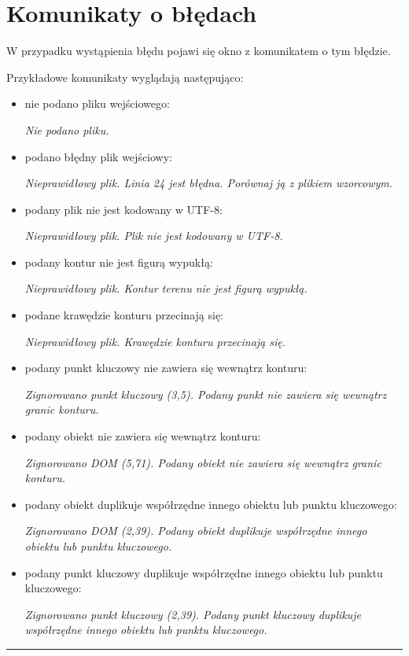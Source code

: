 \documentclass[a4paper,11pt]{article}
\newcommand{\linia}{\rule{\linewidth}{0.4mm}}
\begin{document}
\section{Komunikaty o błędach}
W przypadku wystąpienia błędu pojawi się okno z komunikatem o tym błędzie.

Przykładowe komunikaty wyglądają następująco:
\begin{itemize}
\item nie podano pliku wejściowego:

\textit{Nie podano pliku.}
\item podano błędny plik wejściowy:

\textit{Nieprawidłowy plik. Linia 24 jest błędna. Porównaj ją z plikiem wzorcowym.}
\item podany plik nie jest kodowany w UTF-8:

\textit{Nieprawidłowy plik. Plik nie jest kodowany w UTF-8.}
\item podany kontur nie jest figurą wypukłą:

\textit{Nieprawidłowy plik. Kontur terenu nie jest figurą wypukłą.}
\item podane krawędzie konturu przecinają się:

\textit{Nieprawidłowy plik. Krawędzie konturu przecinają się.}
\item podany punkt kluczowy nie zawiera się wewnątrz konturu:

\textit{Zignorowano punkt kluczowy (3,5). Podany punkt nie zawiera się wewnątrz granic konturu.}
\item podany obiekt nie zawiera się wewnątrz konturu:

\textit{Zignorowano DOM (5,71). Podany obiekt nie zawiera się wewnątrz granic konturu.}
\item podany obiekt duplikuje współrzędne innego obiektu lub punktu kluczowego:

\textit{Zignorowano DOM (2,39). Podany obiekt duplikuje współrzędne innego obiektu lub punktu kluczowego.}
\item podany punkt kluczowy duplikuje współrzędne innego obiektu lub punktu kluczowego:

\textit{Zignorowano punkt kluczowy (2,39).  Podany punkt kluczowy duplikuje współrzędne innego obiektu lub punktu kluczowego.}

\end{itemize}

\noindent\linia
\end{document}
